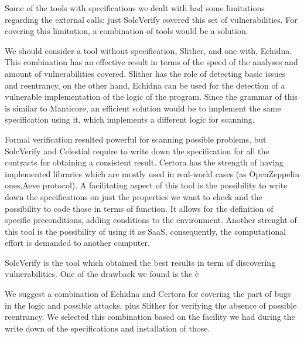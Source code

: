 Some of the tools with specifications we dealt with had some limitations regarding the external calls: just SolcVerify covered this set of vulnerabilities. 
For covering this limitation, a combination of tools would be a solution. 

We should consider a tool without specification, Slither, and one with, Echidna. 
This combination has an effective result in terms of the speed of the analyses and amount of vulnerabilities covered. 
Slither has the role of detecting basic issues and reentrancy, on the other hand, Echidna can be used for the detection of a vulnerable implementation of the logic of the program. 
Since the grammar of this is similar to Manticore, an efficient solution would be to implement the same specification using it, which implements a different logic for scanning. 

Formal verification resulted powerful for scanning possible problems, but SolcVerify and Celestial require to 
write down the specification for all the contracts for obtaining a consistent result. 
Certora has the strength of having implemented libraries which are mostly used in real-world cases (as OpenZeppelin ones,Aeve protocol). 
A facilitating aspect of this tool is the possibility to write down the specifications on just the properties we want to check and 
the possibility to code those in terms of function. It allows for the definition of specific preconditions, adding conditions to the environment. 
Another strenght of this tool is the possibility of using it as SaaS, consequently, the computational effort is demanded to another computer.

SolcVerify is the tool which obtained the best results in term of discovering vulnerabilities. One of the drawback we found is the è

We suggest a combination of Echidna and Certora for covering the part of bugs in the logic and possible attacks, 
plus Slither for verifying the absence of possible reentrancy. 
We selected this combination based on the facility we had during the write down of the specifications and installation of those.

